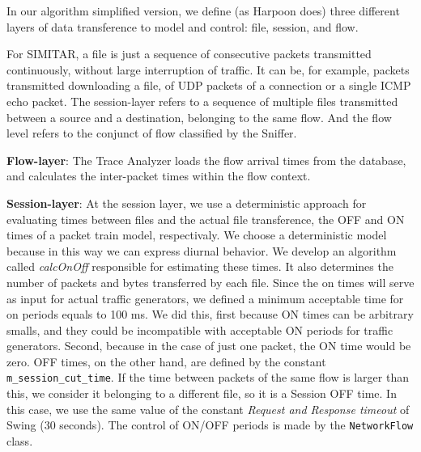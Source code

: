 In our algorithm simplified version, we define (as Harpoon does) three different layers of data transference to model and control: file, session, and flow. 


For SIMITAR, a file is just a sequence of consecutive packets transmitted continuously, without large interruption of traffic. It can be, for example, packets transmitted downloading a file, of UDP packets of a connection or a single ICMP echo packet. The session-layer refers to a sequence of multiple files transmitted between a source and a destination, belonging to the same flow.  And the flow level refers to the conjunct of flow classified by the Sniffer.  


\textbf{Flow-layer}: The Trace Analyzer loads the flow arrival times from the database, and calculates the inter-packet times within the flow context. 


\textbf{Session-layer}: At the session layer, we use a deterministic approach for evaluating times between files and the actual file transference, the OFF and ON times of a packet train model, respectivaly. We choose a deterministic model because in this way we can express diurnal behavior\cite{harpoon-paper}.  We develop an algorithm called \textit{calcOnOff} responsible for estimating these times. It also determines the number of packets and bytes transferred by each file. Since the on times will serve as input for actual traffic generators, we defined a minimum acceptable time for on periods equals to 100 ms. We did this, first because ON times can be arbitrary smalls, and they could be incompatible with acceptable ON periods for traffic generators. Second, because in the case of just one packet, the ON time would be zero. OFF times, on the other hand, are defined by the constant \texttt{m\_session\_cut\_time}. If the time between packets of the same flow is larger than this, we consider it belonging to a different file, so it is a Session OFF time. In this case, we use the same value of the constant \textit{Request and Response timeout} of Swing\cite{swing-paper} (30 seconds).
The control of ON/OFF periods is made by the \texttt{NetworkFlow} class.

